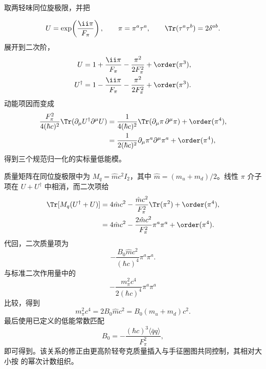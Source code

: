 \begin{derivation}[手征低能作用量中的介子质量]
取两轻味同位旋极限，并把

\begin{equation*}
 U=\exp\!\left(\frac{\ii\pi}{F_\pi}\right),
 \qquad
 \pi=\pi^a\tau^a,
 \qquad
 \Tr(\tau^a\tau^b)=2\delta^{ab}.
\end{equation*}
展开到二次阶，
\begin{align*}
 U&=1+\frac{\ii\pi}{F_\pi}-\frac{\pi^2}{2F_\pi^2}+\order(\pi^3),\\
 U^\dagger&=1-\frac{\ii\pi}{F_\pi}-\frac{\pi^2}{2F_\pi^2}+\order(\pi^3).
\end{align*}
动能项因而变成
\begin{align*}
 \frac{F_\pi^2}{4(\hbar c)^2}
 \Tr(\partial_\mu U^\dagger\partial^\mu U)
 &=\frac1{4(\hbar c)^2}
 \Tr(\partial_\mu\pi\,\partial^\mu\pi)+\order(\pi^4),\\
 &=\frac1{2(\hbar c)^2}
 \partial_\mu\pi^a\partial^\mu\pi^a+\order(\pi^4),
\end{align*}
得到三个规范归一化的实标量低能模。

质量矩阵在同位旋极限中为 $M_q=\hat m c^2 I_2$，其中 $\hat m=(m_u+m_d)/2$。线性 \(\pi\) 介子项在 $U+U^\dagger$ 中相消，而二次项给
\begin{align*}
 \Tr[M_q(U^\dagger+U)]
 &=4\hat m c^2
 -\frac{\hat m c^2}{F_\pi^2}\Tr(\pi^2)+\order(\pi^4),\\
 &=4\hat m c^2
 -\frac{2\hat m c^2}{F_\pi^2}\pi^a\pi^a+\order(\pi^4).
\end{align*}
代回，二次质量项为
\begin{equation*}
 -\frac{B_0\hat m c^2}{(\hbar c)^4}\pi^a\pi^a.
\end{equation*}
与标准二次作用量中的
\begin{equation*}
 -\frac{m_\pi^2c^4}{2(\hbar c)^4}\pi^a\pi^a
\end{equation*}
比较，得到
\begin{equation*}
 m_\pi^2c^4=2B_0\hat m c^2=B_0(m_u+m_d)c^2.
\end{equation*}
最后使用已定义的低能常数匹配
\begin{equation*}
 B_0=-\frac{(\hbar c)^3\langle\bar q q\rangle}{F_\pi^2},
\end{equation*}
即可得到。该关系的修正由更高阶轻夸克质量插入与手征圈图共同控制，其相对大小按 的幂次计数组织。
\end{derivation}

